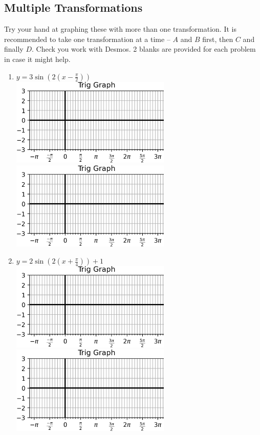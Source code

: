 \documentclass{article}
\begin{document}
\begin{multicols}{2}
\subsection*{Multiple Transformations}
\noindent
Try your hand at graphing these with more than one transformation. It is recommended to take one transformation at a time -- $A$ and $B$ first, then $C$ and finally $D$. Check you work with Desmos. 2 blanks are provided for each problem in case it might help.
\begin{enumerate}
	\item $y=3\sin (2(x-\frac{\pi}{2}))$ \\
	\includegraphics*[width=3in]{Trig Graph.png} \\
	\includegraphics*[width=3in]{Trig Graph.png}
	\item $y=2\sin (2(x+\frac{\pi}{4})) + 1$ \\
	\includegraphics*[width=3in]{Trig Graph.png} \\
	\includegraphics*[width=3in]{Trig Graph.png}
\end{enumerate}
\end{multicols}
\end{document}
